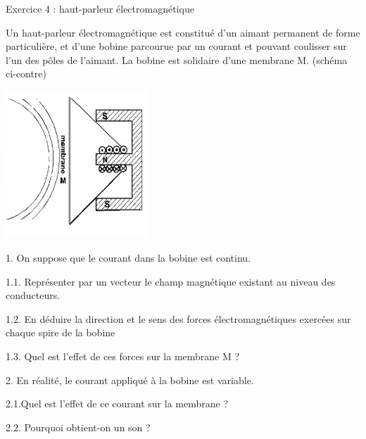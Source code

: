 \documentclass[12pt, french]{article}
\begin{document}
\begin{Box2}{Exercice 4 : haut-parleur électromagnétique }

Un haut-parleur électromagnétique est constitué d’un aimant permanent de forme particulière, et d’une
bobine parcourue par un courant et pouvant coulisser sur l’un des pôles de l’aimant. La bobine est solidaire
d’une membrane M. (schéma ci-contre)
  \begin{center}
     \vspace{-0.5cm}
    \includegraphics[width=0.4\textwidth]{./img/Haut_parleurs.png}
  \end{center}
   1. On suppose que le courant dans la bobine est continu.

   1.1. Représenter par un vecteur le champ magnétique existant au
niveau des conducteurs.

   1.2. En déduire la direction et le sens des forces électromagnétiques exercées sur chaque spire de la bobine
   
   1.3. Quel est l’effet de ces forces sur la membrane M ?

   2. En réalité, le courant appliqué à la bobine est variable.

   2.1.Quel est l’effet de ce courant sur la membrane ?

   2.2. Pourquoi obtient-on un son ?

\end{Box2}
\end{document}
